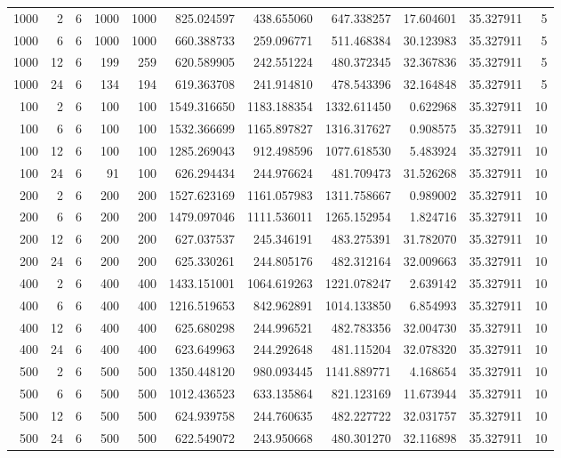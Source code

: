 \begin{table}
\begin{tabular}{rrrrrrrrrrr}
1000 & 2 & 6 & 1000 & 1000 & 825.024597 & 438.655060 & 647.338257 & 17.604601 & 35.327911 & 5 \\
1000 & 6 & 6 & 1000 & 1000 & 660.388733 & 259.096771 & 511.468384 & 30.123983 & 35.327911 & 5 \\
1000 & 12 & 6 & 199 & 259 & 620.589905 & 242.551224 & 480.372345 & 32.367836 & 35.327911 & 5 \\
1000 & 24 & 6 & 134 & 194 & 619.363708 & 241.914810 & 478.543396 & 32.164848 & 35.327911 & 5 \\
100 & 2 & 6 & 100 & 100 & 1549.316650 & 1183.188354 & 1332.611450 & 0.622968 & 35.327911 & 10 \\
100 & 6 & 6 & 100 & 100 & 1532.366699 & 1165.897827 & 1316.317627 & 0.908575 & 35.327911 & 10 \\
100 & 12 & 6 & 100 & 100 & 1285.269043 & 912.498596 & 1077.618530 & 5.483924 & 35.327911 & 10 \\
100 & 24 & 6 & 91 & 100 & 626.294434 & 244.976624 & 481.709473 & 31.526268 & 35.327911 & 10 \\
200 & 2 & 6 & 200 & 200 & 1527.623169 & 1161.057983 & 1311.758667 & 0.989002 & 35.327911 & 10 \\
200 & 6 & 6 & 200 & 200 & 1479.097046 & 1111.536011 & 1265.152954 & 1.824716 & 35.327911 & 10 \\
200 & 12 & 6 & 200 & 200 & 627.037537 & 245.346191 & 483.275391 & 31.782070 & 35.327911 & 10 \\
200 & 24 & 6 & 200 & 200 & 625.330261 & 244.805176 & 482.312164 & 32.009663 & 35.327911 & 10 \\
400 & 2 & 6 & 400 & 400 & 1433.151001 & 1064.619263 & 1221.078247 & 2.639142 & 35.327911 & 10 \\
400 & 6 & 6 & 400 & 400 & 1216.519653 & 842.962891 & 1014.133850 & 6.854993 & 35.327911 & 10 \\
400 & 12 & 6 & 400 & 400 & 625.680298 & 244.996521 & 482.783356 & 32.004730 & 35.327911 & 10 \\
400 & 24 & 6 & 400 & 400 & 623.649963 & 244.292648 & 481.115204 & 32.078320 & 35.327911 & 10 \\
500 & 2 & 6 & 500 & 500 & 1350.448120 & 980.093445 & 1141.889771 & 4.168654 & 35.327911 & 10 \\
500 & 6 & 6 & 500 & 500 & 1012.436523 & 633.135864 & 821.123169 & 11.673944 & 35.327911 & 10 \\
500 & 12 & 6 & 500 & 500 & 624.939758 & 244.760635 & 482.227722 & 32.031757 & 35.327911 & 10 \\
500 & 24 & 6 & 500 & 500 & 622.549072 & 243.950668 & 480.301270 & 32.116898 & 35.327911 & 10 \\

\end{tabular}
\end{table}
